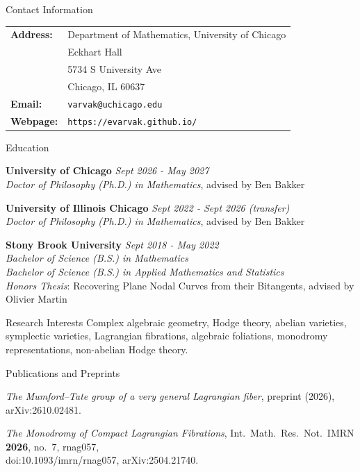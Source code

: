 \documentclass{resume} %
\begin{document}
\begin{rSection}{Contact Information}
\begin{tabular}{l l}
{\bf Address:} & Department of Mathematics, University of Chicago\\
& Eckhart Hall \\
& 5734 S University Ave \\
& Chicago, IL 60637 \\
{\bf Email:} & {\tt varvak@uchicago.edu} \\
{\bf Webpage:} & {\tt https://evarvak.github.io/}
\end{tabular}


\end{rSection}


\begin{rSection}{Education}

{\bf University of Chicago } \hfill {\em Sept 2026 - May 2027}
\\{\textit {Doctor of Philosophy (Ph.D.) in Mathematics}}, advised by Ben Bakker

{\bf University of Illinois Chicago } \hfill {\em Sept 2022 - Sept 2026 (transfer)}
\\{\textit {Doctor of Philosophy (Ph.D.) in Mathematics}}, advised by Ben Bakker

{\bf Stony Brook University } \hfill {\em Sept 2018 - May 2022} 
\\{ \textit {Bachelor of Science (B.S.) in Mathematics}}
\\{ \textit {Bachelor of Science (B.S.) in Applied Mathematics and Statistics}}
\\{ \textit {Honors Thesis}: Recovering Plane Nodal Curves from their Bitangents,
advised by Olivier Martin}



\end{rSection}



\begin{rSection}{Research Interests}
Complex algebraic geometry, Hodge theory, abelian varieties, symplectic varieties, 
Lagrangian fibrations, algebraic foliations, monodromy representations, non-abelian 
Hodge theory.
\end{rSection}


\begin{rSection}{Publications and Preprints}
\begin{etaremune}
\item \textit{The Mumford--Tate group of a very general Lagrangian fiber},
preprint (2026), arXiv:2610.02481.

\item \textit{The Monodromy of Compact Lagrangian Fibrations},
Int.\ Math.\ Res.\ Not.\ IMRN {\bf 2026}, no.~7, rnag057, \\
doi:10.1093/imrn/rnag057, arXiv:2504.21740.

\end{etaremune}

\end{rSection}
\end{document}
